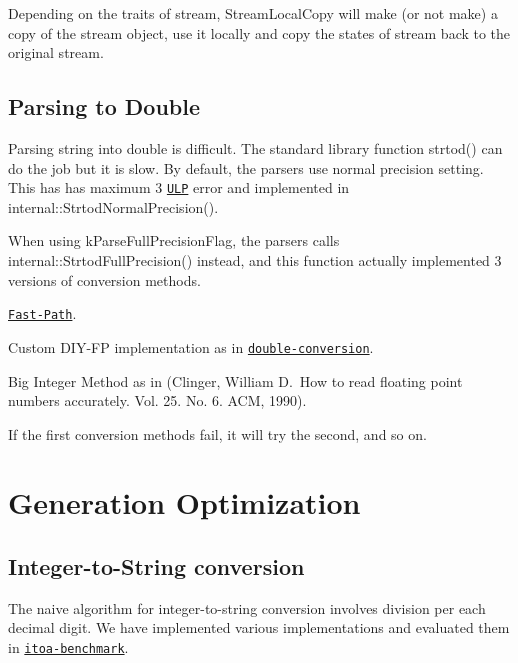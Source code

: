 Depending on the traits of stream, {\ttfamily Stream\+Local\+Copy} will make (or not make) a copy of the stream object, use it locally and copy the states of stream back to the original stream.\hypertarget{md_Commun_Externe_RapidJSON_doc_internals_ParsingDouble}{}\subsection{Parsing to Double}\label{md_Commun_Externe_RapidJSON_doc_internals_ParsingDouble}
Parsing string into {\ttfamily double} is difficult. The standard library function {\ttfamily strtod()} can do the job but it is slow. By default, the parsers use normal precision setting. This has has maximum 3 \href{http://en.wikipedia.org/wiki/Unit_in_the_last_place}{\tt U\+LP} error and implemented in {\ttfamily internal\+::\+Strtod\+Normal\+Precision()}.

When using {\ttfamily k\+Parse\+Full\+Precision\+Flag}, the parsers calls {\ttfamily internal\+::\+Strtod\+Full\+Precision()} instead, and this function actually implemented 3 versions of conversion methods.
\begin{DoxyEnumerate}
\item \href{http://www.exploringbinary.com/fast-path-decimal-to-floating-point-conversion/}{\tt Fast-\/\+Path}.
\item Custom D\+I\+Y-\/\+FP implementation as in \href{https://github.com/floitsch/double-conversion}{\tt double-\/conversion}.
\item Big Integer Method as in (Clinger, William D.\+ \+How to read floating point numbers accurately. Vol. 25. No. 6. A\+CM, 1990).
\end{DoxyEnumerate}

If the first conversion methods fail, it will try the second, and so on.\hypertarget{md_Commun_Externe_RapidJSON_doc_internals_GenerationOptimization}{}\section{Generation Optimization}\label{md_Commun_Externe_RapidJSON_doc_internals_GenerationOptimization}
\hypertarget{md_Commun_Externe_RapidJSON_doc_internals_itoa}{}\subsection{Integer-\/to-\/\+String conversion}\label{md_Commun_Externe_RapidJSON_doc_internals_itoa}
The naive algorithm for integer-\/to-\/string conversion involves division per each decimal digit. We have implemented various implementations and evaluated them in \href{https://github.com/miloyip/itoa-benchmark}{\tt itoa-\/benchmark}.

